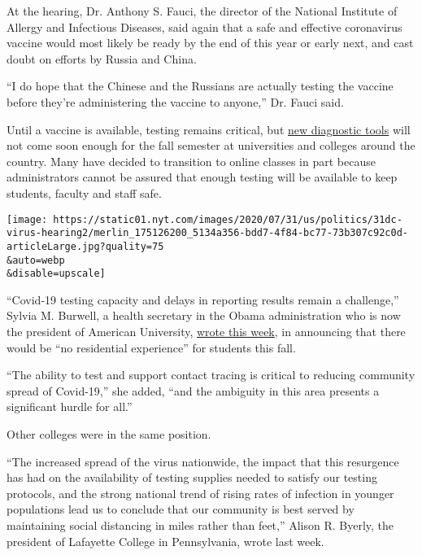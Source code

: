 At the hearing, Dr. Anthony S. Fauci, the director of the National
Institute of Allergy and Infectious Diseases, said again that a safe and
effective coronavirus vaccine would most likely be ready by the end of
this year or early next, and cast doubt on efforts by Russia and China.

``I do hope that the Chinese and the Russians are actually testing the
vaccine before they're administering the vaccine to anyone,'' Dr. Fauci
said.

Until a vaccine is available, testing remains critical, but
\href{https://www.nytimes.com/2020/07/06/health/fast-coronavirus-tests.html}{new
diagnostic tools} will not come soon enough for the fall semester at
universities and colleges around the country. Many have decided to
transition to online classes in part because administrators cannot be
assured that enough testing will be available to keep students, faculty
and staff safe.

\texttt{[image: https://static01.nyt.com/images/2020/07/31/us/politics/31dc-virus-hearing2/merlin\_175126200\_5134a356-bdd7-4f84-bc77-73b307c92c0d-articleLarge.jpg?quality=75\\\&auto=webp\\\&disable=upscale]}

``Covid-19 testing capacity and delays in reporting results remain a
challenge,'' Sylvia M. Burwell, a health secretary in the Obama
administration who is now the president of American University,
\href{https://www.american.edu/president/announcements/july-30-2020.cfm}{wrote
this week}, in announcing that there would be ``no residential
experience'' for students this fall.

``The ability to test and support contact tracing is critical to
reducing community spread of Covid-19,'' she added, ``and the ambiguity
in this area presents a significant hurdle for all.''

Other colleges were in the same position.

``The increased spread of the virus nationwide, the impact that this
resurgence has had on the availability of testing supplies needed to
satisfy our testing protocols, and the strong national trend of rising
rates of infection in younger populations lead us to conclude that our
community is best served by maintaining social distancing in miles
rather than feet,'' Alison R. Byerly, the president of Lafayette College
in Pennsylvania, wrote last week.

\href{https://www.nytimes.com/news-event/coronavirus?action=click\&pgtype=Article\&state=default\&region=MAIN_CONTENT_3\&context=storylines_faq}{}

